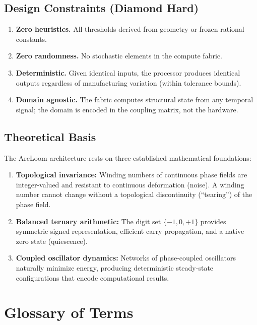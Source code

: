 \documentclass[11pt, a4paper]{article}
\begin{document}
\subsection{Design Constraints (Diamond Hard)}

\begin{enumerate}[label=\arabic*.]
  \item \textbf{Zero heuristics.} All thresholds derived from geometry or
        frozen rational constants.
  \item \textbf{Zero randomness.} No stochastic elements in the compute fabric.
  \item \textbf{Deterministic.} Given identical inputs, the processor produces
        identical outputs regardless of manufacturing variation (within
        tolerance bounds).
  \item \textbf{Domain agnostic.} The fabric computes structural state from
        any temporal signal; the domain is encoded in the coupling matrix,
        not the hardware.
\end{enumerate}

\subsection{Theoretical Basis}

The ArcLoom architecture rests on three established mathematical foundations:

\begin{enumerate}[label=\arabic*.]
  \item \textbf{Topological invariance:} Winding numbers of continuous phase
        fields are integer-valued and resistant to continuous deformation
        (noise). A winding number cannot change without a topological
        discontinuity (``tearing'') of the phase field.
  \item \textbf{Balanced ternary arithmetic:} The digit set $\{-1, 0, +1\}$
        provides symmetric signed representation, efficient carry propagation,
        and a native zero state (quiescence).
  \item \textbf{Coupled oscillator dynamics:} Networks of phase-coupled
        oscillators naturally minimize energy, producing deterministic
        steady-state configurations that encode computational results.
\end{enumerate}

\section{Glossary of Terms}
\end{document}

